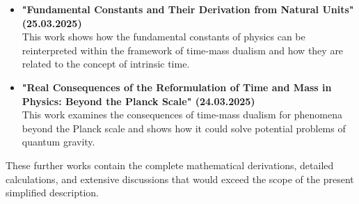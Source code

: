 \documentclass{article}
\begin{document}
\begin{itemize}
		\item \textbf{"Fundamental Constants and Their Derivation from Natural Units" (25.03.2025)} \\
		This work shows how the fundamental constants of physics can be reinterpreted within the framework of time-mass dualism and how they are related to the concept of intrinsic time.
		
		\item \textbf{"Real Consequences of the Reformulation of Time and Mass in Physics: Beyond the Planck Scale" (24.03.2025)} \\
		This work examines the consequences of time-mass dualism for phenomena beyond the Planck scale and shows how it could solve potential problems of quantum gravity.
		
	\end{itemize}
	
	These further works contain the complete mathematical derivations, detailed calculations, and extensive discussions that would exceed the scope of the present simplified description.
	
\end{document}
